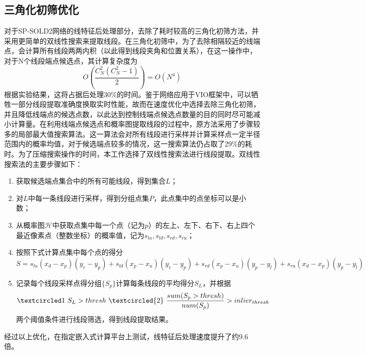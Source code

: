 \subsection{三角化初筛优化}
对于SP-SOLD2网络的线特征后处理部分，去除了耗时较高的三角化初筛方法，并采用更简单的双线性搜索来提取线段。在三角化初筛中，为了去除相隔较近的线端点，会计算所有线段两两内积（以此得到线段夹角和位置关系），在这一操作中，对于N个线段端点候选点，其计算复杂度为
\[O(\frac{C^2_N(C^2_N-1)}{2})=O(N^4)\]
根据实验结果，这将占据后处理30\%的时间。鉴于网络应用于VIO框架中，可以牺牲一部分线段提取准确度换取实时性能，故而在速度优化中选择去除三角化初筛，并且降低线端点的候选点数，以此达到控制线端点候选点数量的目的同时尽可能减小计算量。在利用线端点候选点和概率图提取线段的过程中，原方法采用了步骤较多的局部最大值搜索算法。这一算法会对所有线段进行采样并计算采样点一定半径范围内的概率均值，对于候选端点较多的情况，这一搜索算法仍占取了29\%的耗时。为了压缩搜索操作的时间，本工作选择了双线性搜索法进行线段提取。双线性搜索法的主要步骤如下：
\begin{enumerate}
  \item 获取候选端点集合中的所有可能线段，得到集合$L$；
  \item 对$L$中每一条线段进行采样，得到分组点集$P$，此点集中的点坐标可以是小数；
  \item 从概率图$\mathcal{H}$中获取点集中每一个点（记为$p$）的左上、左下、右下、右上四个最近像素点（整数坐标）的概率值，记为$s_{lu}, s_{ld}, s_{rd}, s_{ru}$；
  \item 按照下式计算点集中每个点的得分
  \[S=s_{lu}(x_d-x_p)(y_r-y_p)+s_{ld}(x_p-x_u)(y_r-y_p)+s_{rd}(x_p-x_u)(y_p-y_l)+s_{ru}(x_d-x_p)(y_p-y_l)\]
  \item 记录每个线段采样点得分组$\{S_p\}$计算每条线段的平均得分$S_L$，并根据
  \[\textcircled1 S_L>thresh \textcircled{2} \frac{sum(S_p>thresh)}{num(S_p)}>inlier_{thresh}\]
  两个阈值条件进行线段筛选，得到线段提取结果。
\end{enumerate}
经过以上优化，在指定嵌入式计算平台上测试，线特征后处理速度提升了约9.6倍。
